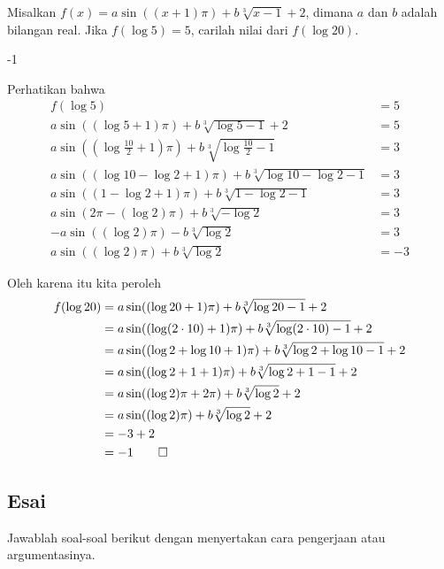 \documentclass[12pt]{scrartcl}
\begin{document}
	\begin{soalbaru}
		Misalkan $f(x)=a\sin((x+1)\pi) + b\sqrt[3]{x-1}+2$, dimana $a$ dan $b$ adalah bilangan real. Jika $f(\log 5)=5$, carilah nilai dari $f(\log 20)$.
		
		\begin{jawaban}
		-1
		\end{jawaban}
		\begin{solusi}
		Perhatikan bahwa 
		\begin{equation*}
		\begin{split}
		f(\log 5)&=5\\
		a\sin((\log 5+1)\pi) + b\sqrt[3]{\log 5-1}+2&=5\\
		a\sin((\log \frac{10}{2}+1)\pi) + b\sqrt[3]{\log \frac{10}{2}-1}&=3\\
		a\sin((\log 10 - \log 2+1)\pi) + b\sqrt[3]{\log 10 - \log 2 -1}&=3\\
		a\sin((1 - \log 2+1)\pi) + b\sqrt[3]{1 - \log 2 -1}&=3\\
		a\sin(2\pi - (\log 2)\pi) + b\sqrt[3]{- \log 2}&=3\\
		-a\sin((\log 2)\pi) - b\sqrt[3]{\log 2}&=3\\
		a\sin((\log 2)\pi) + b\sqrt[3]{\log 2}&=-3
		\end{split}
		\end{equation*}
		
		Oleh karena itu kita peroleh
				\begin{equation*}
				\begin{split}
				f(\log 20)&=a\sin((\log 20+1)\pi) + b\sqrt[3]{\log 20-1}+2\\
						  &=a\sin((\log (2\cdot10)+1)\pi) + b\sqrt[3]{\log (2\cdot10)-1}+2\\
						  &=a\sin((\log 2 +\log 10+1)\pi) + b\sqrt[3]{\log 2+\log 10-1}+2\\
						  &=a\sin((\log 2 +1+1)\pi) + b\sqrt[3]{\log 2+1-1}+2\\
						  &=a\sin((\log 2)\pi+2\pi) + b\sqrt[3]{\log 2}+2\\
						  &=a\sin((\log 2)\pi) + b\sqrt[3]{\log 2}+2\\
						  &=-3+2\\
						  &=-1 \qed
				\end{split}
				\end{equation*}
		\end{solusi}
	\end{soalbaru}
\newpage
\subsection{Esai}
Jawablah soal-soal berikut dengan menyertakan cara pengerjaan atau argumentasinya.
	
\end{document}
